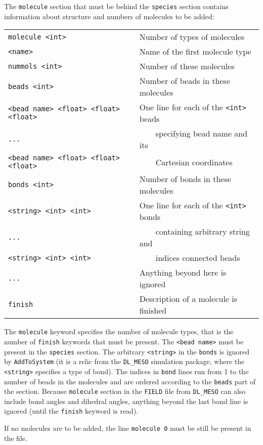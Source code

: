The \texttt{molecule} section that must be behind the \texttt{species}
section contains information about structure and numbers of molecules to be
added:

\noindent
\begin{longtable}{ll}
  \texttt{molecule <int>} & Number of types of molecules \\
  \texttt{<name>} & Name of the first molecule type \\
  \texttt{nummols <int>} & Number of these molecules \\
  \texttt{beads <int>} & Number of beads in these molecules \\
  \texttt{<bead name> <float> <float> <float>} & One line for each of the \texttt{<int>} beads \\
  \texttt{...} & \ \ \ \ specifying bead name and its \\
  \texttt{<bead name> <float> <float> <float>} & \ \ \ \ Cartesian coordinates \\
  \texttt{bonds <int>} & Number of bonds in these molecules \\
  \texttt{<string> <int> <int>} & One line for each of the \texttt{<int>} bonds \\
  \texttt{...} & \ \ \ \ containing arbitrary string and \\
  \texttt{<string> <int> <int>} & \ \ \ \ indices connected beads \\
  \texttt{...} & Anything beyond here is ignored \\
  \texttt{finish} & Description of a molecule is finished \\
\end{longtable}

The \texttt{molecule} keyword specifies the number of molecule types, that
is the number of \texttt{finish} keywords that must be present. The
\texttt{<bead name>} must be present in the \texttt{species} section. The
arbitrary \texttt{<string>} in the \texttt{bonds} is ignored by
\texttt{AddToSystem} (it is a relic from the \texttt{DL\_MESO} simulation
package, where the \texttt{<string>} specifies a type of bond). The indices
in \texttt{bond} lines run from 1 to the number of beads in the molecules and are
ordered according to the \texttt{beads} part of the section. Because
\texttt{molecule} section in the \texttt{FIELD} file from \texttt{DL\_MESO}
can also include bond angles and dihedral angles, anything beyond the last
bond line is ignored (until the \texttt{finish} keyword is read).

If no molecules are to be added, the line \texttt{molecule 0} must be still
be present in the file.

